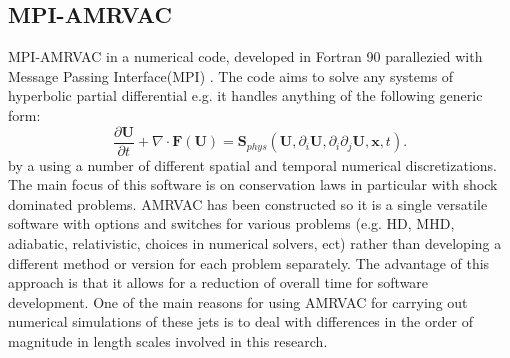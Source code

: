 \documentclass[12pt,a4paper,twoside]{article}
\begin{document}
\subsection{MPI-AMRVAC}
MPI-AMRVAC in a numerical code, developed in Fortran 90 parallezied with Message Passing Interface(MPI) \citep{Keppens2012}. The code aims to solve any systems of hyperbolic partial differential e.g. it handles anything of the following generic form: 
\begin{equation}
\frac{\partial \boldsymbol{U}}{\partial t} + \nabla \cdot \boldsymbol{F}(\boldsymbol{U}) = \boldsymbol{S}_{phys} (\boldsymbol{U}, \partial_{i} \boldsymbol{U}, \partial_i \partial_j \boldsymbol{U},\boldsymbol{x},t) .
\end{equation}
 by a using a number of different spatial and temporal numerical discretizations.
The main focus of this software is on conservation laws in particular with shock dominated problems. AMRVAC has been constructed so it is a single versatile software with options and switches for various problems (e.g. HD, MHD, adiabatic, relativistic, choices in numerical solvers, ect) rather than developing a different method or version for each problem separately. The advantage of this approach is that it allows for a reduction of overall time for software development. One of the main reasons for using AMRVAC for carrying out numerical simulations of these jets is to deal with differences in the order of magnitude in length scales involved in this research.
\end{document}
